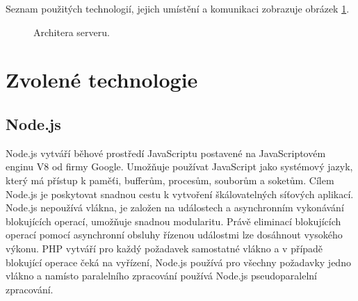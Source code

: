 Seznam použitých technologií, jejich umístění a komunikaci zobrazuje obrázek \ref{img:server-architektura}.
\begin{figure}[h]
	\centering
	\caption{Architera serveru.}\label{img:server-architektura}
\end{figure}

\section{Zvolené technologie}
\subsection{Node.js}
Node.js vytváří běhové prostředí JavaScriptu postavené na JavaScriptovém enginu V8 od firmy Google. Umožňuje používat JavaScript jako systémový jazyk, který má přístup k paměťi, bufferům, procesům, souborům a soketům. Cílem Node.js je poskytovat snadnou cestu k vytvoření škálovatelných síťových aplikací. Node.js nepoužívá vlákna, je založen na událostech a asynchronním vykonávání blokujících operací, umožňuje snadnou modularitu. Právě eliminací blokujících operací pomocí asynchronní obsluhy řízenou událostmi lze dosáhnout vysokého výkonu. PHP vytváří pro každý požadavek samostatné vlákno a v případě blokující operace čeká na vyřízení, Node.js používá pro všechny požadavky jedno vlákno a namísto paralelního zpracování používá Node.js pseudoparalelní zpracování.

